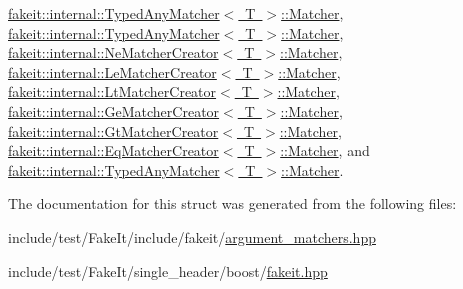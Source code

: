 \mbox{\hyperlink{structfakeit_1_1internal_1_1TypedAnyMatcher_1_1Matcher_a7a4fb0a098671bd53dd9403169734649}{fakeit\+::internal\+::\+Typed\+Any\+Matcher$<$ T $>$\+::\+Matcher}}, \mbox{\hyperlink{structfakeit_1_1internal_1_1TypedAnyMatcher_1_1Matcher_a7a4fb0a098671bd53dd9403169734649}{fakeit\+::internal\+::\+Typed\+Any\+Matcher$<$ T $>$\+::\+Matcher}}, \mbox{\hyperlink{structfakeit_1_1internal_1_1NeMatcherCreator_1_1Matcher_acd3d0aca6309e39ba6b2856f4a2ef920}{fakeit\+::internal\+::\+Ne\+Matcher\+Creator$<$ T $>$\+::\+Matcher}}, \mbox{\hyperlink{structfakeit_1_1internal_1_1LeMatcherCreator_1_1Matcher_a9df22204323939912395f8a4c64d0698}{fakeit\+::internal\+::\+Le\+Matcher\+Creator$<$ T $>$\+::\+Matcher}}, \mbox{\hyperlink{structfakeit_1_1internal_1_1LtMatcherCreator_1_1Matcher_a0c1ba926c3b7b8f3aa1db50a55aa1a1d}{fakeit\+::internal\+::\+Lt\+Matcher\+Creator$<$ T $>$\+::\+Matcher}}, \mbox{\hyperlink{structfakeit_1_1internal_1_1GeMatcherCreator_1_1Matcher_a5f89ea76a9474243dedbfc74bb1ba380}{fakeit\+::internal\+::\+Ge\+Matcher\+Creator$<$ T $>$\+::\+Matcher}}, \mbox{\hyperlink{structfakeit_1_1internal_1_1GtMatcherCreator_1_1Matcher_a94c09643f70784105c584eb3341a0cef}{fakeit\+::internal\+::\+Gt\+Matcher\+Creator$<$ T $>$\+::\+Matcher}}, \mbox{\hyperlink{structfakeit_1_1internal_1_1EqMatcherCreator_1_1Matcher_a777fef5dafff87f2e8cb7a0201a9bc78}{fakeit\+::internal\+::\+Eq\+Matcher\+Creator$<$ T $>$\+::\+Matcher}}, and \mbox{\hyperlink{structfakeit_1_1internal_1_1TypedAnyMatcher_1_1Matcher_a7a4fb0a098671bd53dd9403169734649}{fakeit\+::internal\+::\+Typed\+Any\+Matcher$<$ T $>$\+::\+Matcher}}.



The documentation for this struct was generated from the following files\+:\begin{DoxyCompactItemize}
\item 
include/test/\+Fake\+It/include/fakeit/\mbox{\hyperlink{argument__matchers_8hpp}{argument\+\_\+matchers.\+hpp}}\item 
include/test/\+Fake\+It/single\+\_\+header/boost/\mbox{\hyperlink{single__header_2boost_2fakeit_8hpp}{fakeit.\+hpp}}\end{DoxyCompactItemize}
